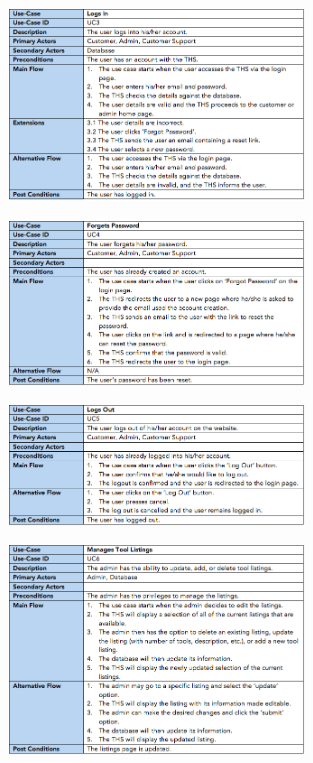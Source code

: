 \documentclass[fontsize=11pt]{extarticle}
\numberwithin{figure}{section} %
\numberwithin{table}{section}%
\begin{document}
\begin{figure}[H]
      \centering
      \includegraphics[trim = 0 0 0 0, clip, width=0.7\textwidth]{TempImg/UC3.png}
 \end{figure}

\begin{figure}[H]
      \centering
      \includegraphics[trim = 0 0 0 0, clip, width=0.7\textwidth]{TempImg/UC4.png}
 \end{figure}

\begin{figure}[H]
      \centering
      \includegraphics[trim = 0 0 0 0, clip, width=0.7\textwidth]{TempImg/UC5.png}
 \end{figure}

\begin{figure}[H]
      \centering
      \includegraphics[trim = 0 0 0 0, clip, width=0.7\textwidth]{TempImg/UC6.png}
 \end{figure}
\end{document}
